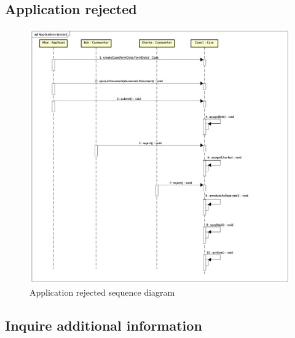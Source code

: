 \newpage
\subsection{Application rejected}
\begin{figure}[htb!]
    \centering
    \includegraphics[width=\textwidth]{img/sd-application-rejected.png}
    \caption{Application rejected sequence diagram}
\end{figure}

\subsection{Inquire additional information}



